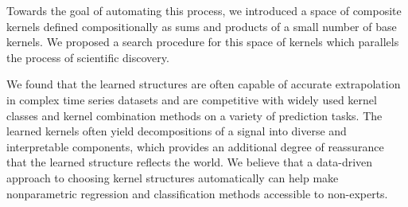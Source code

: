 \documentclass[twoside]{article}
\begin{document}
{Towards the goal of automating this process, we introduced a space of composite kernels defined compositionally as sums and products of a small number of base kernels.
We proposed a search procedure for this space of kernels which parallels the process of scientific discovery.

We found that the learned structures are often capable of accurate extrapolation in complex time series datasets and are competitive with widely used kernel classes and kernel combination methods on a variety of prediction tasks.
The learned kernels often yield decompositions of a signal into diverse and interpretable components, which provides an additional degree of reassurance that the learned structure reflects the world.
We believe that a data-driven approach to choosing kernel structures automatically can help make nonparametric regression and classification methods accessible to non-experts.













}
\end{document}
